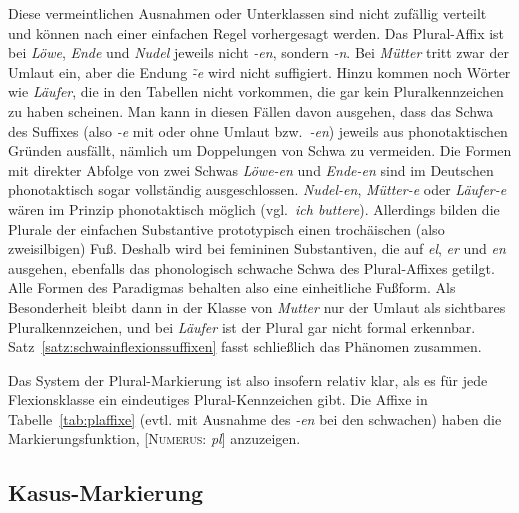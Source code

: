 \newpage

Diese vermeintlichen Ausnahmen oder Unterklassen sind nicht zufällig verteilt und können nach einer einfachen Regel vorhergesagt werden.
Das Plural-Affix ist bei \textit{Löwe}, \textit{Ende} und \textit{Nudel} jeweils nicht \textit{-en}, sondern \textit{-n}.
Bei \textit{Mütter} tritt zwar der Umlaut ein, aber die Endung \textit{\~-e} wird nicht suffigiert.
Hinzu kommen noch Wörter wie \textit{Läufer}, die in den Tabellen nicht vorkommen, die gar kein Pluralkennzeichen zu haben scheinen.
Man kann in diesen Fällen davon ausgehen, dass das Schwa des Suffixes (also \textit{-e} mit oder ohne Umlaut bzw.\ \textit{-en}) jeweils aus phonotaktischen Gründen ausfällt, nämlich um Doppelungen von Schwa zu vermeiden.
Die Formen mit direkter Abfolge von zwei Schwas \textit{\Ast Löwe-en} und \textit{\Ast Ende-en} sind im Deutschen phonotaktisch sogar vollständig ausgeschlossen.
\textit{\Ast Nudel-en}, \textit{\Ast Mütter-e} oder \textit{\Ast Läufer-e} wären im Prinzip phonotaktisch möglich (vgl.\ \textit{ich buttere}).
Allerdings bilden die Plurale der einfachen Substantive prototypisch einen trochäischen (also zweisilbigen) Fuß.
Deshalb wird bei femininen Substantiven, die auf \textit{el}, \textit{er} und \textit{en} ausgehen, ebenfalls das phonologisch schwache Schwa des Plural-Affixes getilgt.
Alle Formen des Paradigmas behalten also eine einheitliche Fußform.
Als Besonderheit bleibt dann in der Klasse von \textit{Mutter} nur der Umlaut als sichtbares Pluralkennzeichen, und bei \textit{Läufer} ist der Plural gar nicht formal erkennbar.
Satz~\ref{satz:schwainflexionssuffixen} fasst schließlich das Phänomen zusammen.


Das System der Plural-Markierung ist also insofern relativ klar, als es für jede Flexionsklasse ein eindeutiges Plural-Kennzeichen gibt.
Die Affixe in Tabelle~\ref{tab:plaffixe} (evtl. mit Ausnahme des \textit{-en} bei den schwachen) haben die Markierungsfunktion, [\textsc{Numerus}: \textit{pl}] anzuzeigen.

\subsection{Kasus-Markierung}

